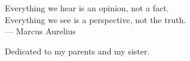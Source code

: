 \thispagestyle{empty}


\vspace*{3cm}

\begin{center}
    Everything we hear is an opinion, not a fact. \\ Everything we see is a perspective, not the truth.  \\ \medskip
    --- Marcus Aurelius 
\end{center}

\medskip

\begin{center}
    Dedicated to my parents and my sister.
\end{center}